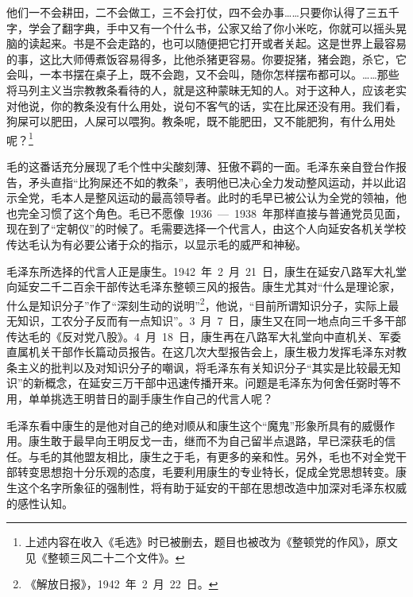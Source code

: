 \begin{quoting}
他们一不会耕田，二不会做工，三不会打仗，四不会办事……只要你认得了三五千字，学会了翻字典，手中又有一个什么书，公家又给了你小米吃，你就可以摇头晃脑的读起来。书是不会走路的，也可以随便把它打开或者关起。这是世界上最容易的事，这比大师傅煮饭容易得多，比他杀猪更容易。你要捉猪，猪会跑，杀它，它会叫，一本书摆在桌子上，既不会跑，又不会叫，随你怎样摆布都可以。……那些将马列主义当宗教教条看待的人，就是这种蒙昧无知的人。对于这种人，应该老实对他说，你的教条没有什么用处，说句不客气的话，实在比屎还没有用。我们看，狗屎可以肥田，人屎可以喂狗。教条呢，既不能肥田，又不能肥狗，有什么用处呢？\footnote{上述内容在收入《毛选》时已被删去，题目也被改为《整顿党的作风》，原文见《整顿三风二十二个文件》。}
\end{quoting}
毛的这番话充分展现了毛个性中尖酸刻薄、狂傲不羁的一面。毛泽东亲自登台作报告，矛头直指“比狗屎还不如的教条”，表明他已决心全力发动整风运动，并以此诏示全党，毛本人是整风运动的最高领导者。此时的毛早已被公认为全党的领袖，他也完全习惯了这个角色。毛已不愿像~1936~—~1938~年那样直接与普通党员见面，现在到了“定朝仪”的时候了。毛需要选择一个代言人，由这个人向延安各机关学校传达毛认为有必要公诸于众的指示，以显示毛的威严和神秘。

毛泽东所选择的代言人正是康生。1942~年~2~月~21~日，康生在延安八路军大礼堂向延安二千二百余干部传达毛泽东整顿三风的报告。康生尤其对“什么是理论家，什么是知识分子”作了“深刻生动的说明”\footnote{《解放日报》，1942~年~2~月~22~日。}，他说，“目前所谓知识分子，实际上最无知识，工农分子反而有一点知识”。3~月~7~日，康生又在同一地点向三千多干部传达毛的《反对党八股》。4~月~18~日，康生再在八路军大礼堂向中直机关、军委直属机关干部作长篇动员报告。在这几次大型报告会上，康生极力发挥毛泽东对教条主义的批判以及对知识分子的嘲讽，将毛泽东有关知识分子“其实是比较最无知识”的新概念，在延安三万干部中迅速传播开来。问题是毛泽东为何舍任弼时等不用，单单挑选王明昔日的副手康生作自己的代言人呢？

毛泽东看中康生的是他对自己的绝对顺从和康生这个“魔鬼”形象所具有的威慑作用。康生敢于最早向王明反戈一击，继而不为自己留半点退路，早已深获毛的信任。与毛的其他盟友相比，康生之于毛，有更多的亲和性。另外，毛也不对全党干部转变思想抱十分乐观的态度，毛要利用康生的专业特长，促成全党思想转变。康生这个名字所象征的强制性，将有助于延安的干部在思想改造中加深对毛泽东权威的感性认知。

